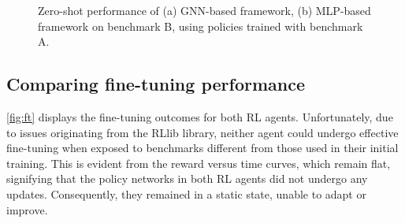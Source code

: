 \documentclass[letterpaper]{article}
\begin{document}
\begin{figure}[h!]
\begin{subfigure}[b]{0.45\textwidth}
        \caption{}
    \end{subfigure}
    \caption{Zero-shot performance of (a) GNN-based framework, (b) MLP-based framework on benchmark B, using policies trained with benchmark A.}
    \label{fig:0shot}
\end{figure}

\subsection{Comparing fine-tuning performance}

\autoref{fig:ft} displays the fine-tuning outcomes for both RL agents. Unfortunately, due to issues originating from the RLlib library, neither agent could undergo effective fine-tuning when exposed to benchmarks different from those used in their initial training. This is evident from the reward versus time curves, which remain flat, signifying that the policy networks in both RL agents did not undergo any updates. Consequently, they remained in a static state, unable to adapt or improve.
\end{document}
